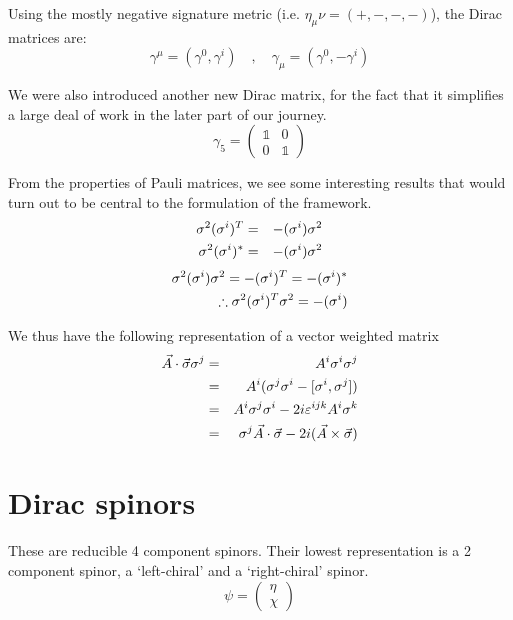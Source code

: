 Using the mostly negative signature metric (i.e. $\eta_\mu\nu = (+, -, -, -)$), the Dirac matrices are:
\begin{equation}
    \gamma^\mu = (\gamma^0, \gamma^i) \quad , \quad\gamma_\mu = (\gamma^0, -\gamma^i)
    \label{eqn:2:dirac matrices lowered}
\end{equation}

We were also introduced another new Dirac matrix, for the fact that it simplifies a large deal of work in the later part of our journey.
\begin{equation}
    \gamma_5 =
    \begin{pmatrix}
        \mathbb{1} & 0\\
        0 & \mathbb{1}
        \label{eqn:2:dirac matrix 5}
    \end{pmatrix}
\end{equation}

From the properties of Pauli matrices, we see some interesting results that would turn out to be central to the formulation of the framework.
\begin{eqnarray}
    \sigma^2 (\sigma^i)^T &=& - (\sigma^i) \sigma^2 \nonext
    \sigma^2 (\sigma^i)^* &=& - (\sigma^i) \sigma^2
    \label{eqn:2:pauli matrix property 1}
\end{eqnarray}
\begin{eqnarray}
    \sigma^2 (\sigma^i) \sigma^2 = - (\sigma^i)^T = - (\sigma^i)^*\nonext
    \therefore \sigma^2 (\sigma^i)^T \sigma^2 = - (\sigma^i)
    \label{eqn:2:sigma T and *}
\end{eqnarray}

We thus have the following representation of a vector weighted matrix
\begin{eqnarray}
    \Vec{A} \cdot \Vec{\sigma} \sigma^j &=& A^i \sigma^i \sigma^j \nonext
    &=& A^i (\sigma^j \sigma^i - [\sigma^i, \sigma^j]) \nonext
    &=& A^i \sigma^j \sigma^i - 2 i \varepsilon^{ijk}A^i \sigma^k \nonext
    &=& \sigma^j \Vec{A} \cdot \Vec{\sigma} - 2 i (\Vec{A} \times \Vec{\sigma})
    \label{eqn:2:vector weighted matrix}
\end{eqnarray}

\section{Dirac spinors}
These are reducible 4 component spinors. Their lowest representation is a 2 component spinor, a `left-chiral' and a `right-chiral' spinor. 
\begin{equation}
    \psi = \begin{pmatrix} \eta \\ \chi \end{pmatrix}
    \label{eqn:2:dirac spinor}
\end{equation}

